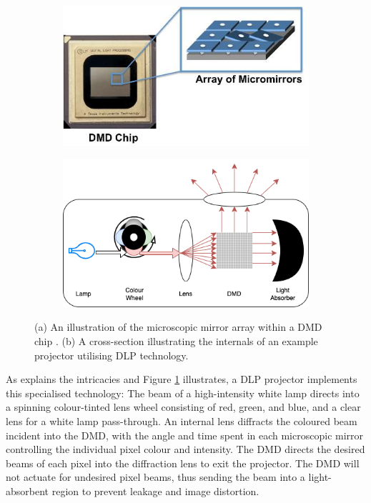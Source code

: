 \begin{figure}[h]
    \centering
    \begin{subfigure}{.4\textwidth}
        \centering
        \includegraphics[width=1\linewidth]{assets/dmd-chip.jpg}
        \caption{}
    \end{subfigure}
    \qquad
    \begin{subfigure}{.4\textwidth}
        \centering
        \includegraphics[width=1\linewidth]{assets/dlp-projector.png}
        \caption{}
    \end{subfigure}
    \caption{(a) An illustration of the microscopic mirror array within a DMD chip \cite{HowDoesDLP}. (b) A cross-section illustrating the internals of an example projector utilising DLP technology.}
    \label{fig:dmd_dlp}
\end{figure}

As \cite{HowDLPProjector} explains the intricacies and Figure \ref{fig:dmd_dlp} illustrates, a DLP projector implements this specialised technology: The beam of a high-intensity white lamp directs into a spinning colour-tinted lens wheel consisting of red, green, and blue, and a clear lens for a white lamp pass-through. An internal lens diffracts the coloured beam incident into the DMD, with the angle and time spent in each microscopic mirror controlling the individual pixel colour and intensity. The DMD directs the desired beams of each pixel into the diffraction lens to exit the projector. The DMD will not actuate for undesired pixel beams, thus sending the beam into a light-absorbent region to prevent leakage and image distortion.

